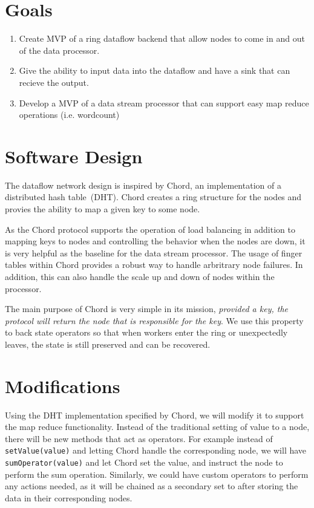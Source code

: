 \documentclass[journal]{IEEEtran}
\begin{document}
\section{Goals}

\begin{enumerate}
\item Create MVP of a ring dataflow backend that allow nodes to come in and out of the data processor.

\item Give the ability to input data into the dataflow and have a sink that can recieve the output.

\item Develop a MVP of a data stream processor that can support easy map reduce operations (i.e. wordcount)
\end{enumerate}
\section{Software Design}

The dataflow network design is inspired by Chord, an implementation of a distributed hash table\ (DHT). Chord creates a ring structure for the nodes and provies the ability to map a given key to some node.

As the Chord protocol supports the operation of load balancing in addition to mapping keys to nodes and controlling the behavior when the nodes are down, it is very helpful as the baseline for the data stream processor. The usage of finger tables within Chord provides a robust way to handle arbritrary node failures. In addition, this can also handle the scale up and down of nodes within the processor.

The main purpose of Chord is very simple in its mission, \textit{provided a key, the protocol will return the node that is responsible for the key}. We use this property to back state operators so that when workers enter the ring or unexpectedly leaves, the state is still preserved and can be recovered.

\section{Modifications}
Using the DHT implementation specified by Chord, we will modify it to support the map reduce functionality. Instead of the traditional setting of value to a node, there will be new methods that act as operators. For example instead of \texttt{setValue(value)} and letting Chord handle the corresponding node, we will have \texttt{sumOperator(value)} and let Chord set the value, and instruct the node to perform the sum operation. Similarly, we could have custom operators to perform any actions needed, as it will be chained as a secondary set to after storing the data in their corresponding nodes.
\end{document}

